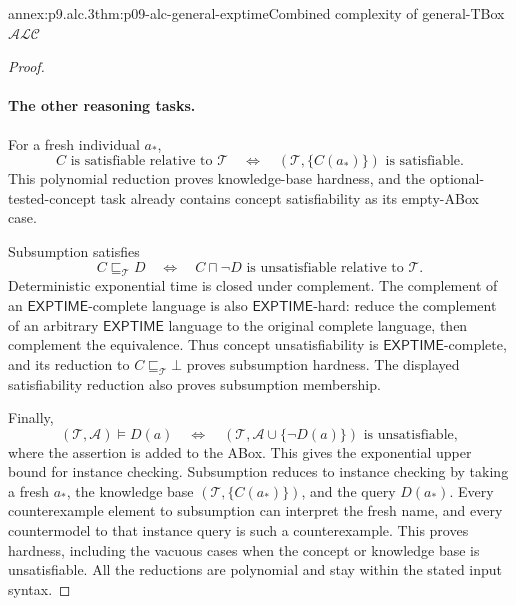 \begin{annexitem}{annex:p9.alc.3}{thm:p09-alc-general-exptime}{Combined complexity of general-TBox \(\mathcal{ALC}\)}
\begin{proof}
\paragraph{The other reasoning tasks.}
For a fresh individual \(a_*\),
\[
 C\text{ is satisfiable relative to }\mathcal T
 \quad\Longleftrightarrow\quad
 (\mathcal T,\{C(a_*)\})\text{ is satisfiable}.
\]
This polynomial reduction proves knowledge-base hardness, and
the optional-tested-concept task already contains concept
satisfiability as its empty-ABox case.

Subsumption satisfies
\[
 C\sqsubseteq_{\mathcal T}D
 \quad\Longleftrightarrow\quad
 C\sqcap\neg D\text{ is unsatisfiable relative to }\mathcal T.
\]
Deterministic exponential time is closed under complement.
The complement of an \(\mathsf{EXPTIME}\)-complete language is
also \(\mathsf{EXPTIME}\)-hard: reduce the complement of an arbitrary
\(\mathsf{EXPTIME}\) language to the original complete language,
then complement the equivalence.
Thus concept unsatisfiability is \(\mathsf{EXPTIME}\)-complete,
and its reduction to \(C\sqsubseteq_{\mathcal T}\bot\) proves
subsumption hardness.  The displayed satisfiability reduction
also proves subsumption membership.

Finally,
\[
 (\mathcal T,\mathcal A)\models D(a)
 \quad\Longleftrightarrow\quad
 (\mathcal T,\mathcal A\cup\{\neg D(a)\})
                         \text{ is unsatisfiable},
\]
where the assertion is added to the ABox.
This gives the exponential upper bound for instance checking.
Subsumption reduces to instance checking by taking a fresh \(a_*\),
the knowledge base \((\mathcal T,\{C(a_*)\})\), and the query
\(D(a_*)\).
Every counterexample element to subsumption can interpret the fresh
name, and every countermodel to that instance query is such a
counterexample.  This proves hardness, including the vacuous cases
when the concept or knowledge base is unsatisfiable.
All the reductions are polynomial and stay within the stated input syntax.
\end{proof}
\end{annexitem}
